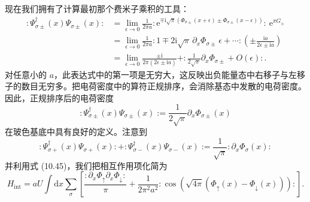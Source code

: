 现在我们拥有了计算最初那个费米子乘积的工具：
\begin{align*}
:\Psi_{\sigma\pm}^{\dagger}(x)\Psi_{\sigma\pm}(x):&=\lim_{\epsilon\to 0}\frac{1}{2\pi a}:\mathrm{e}^{\mp\mathrm{i}\sqrt{\pi}\left(\Phi_{\sigma\pm}(x+\epsilon)\pm\Phi_{\sigma\pm}(x-\epsilon)\right)}:\ \mathrm{e}^{\pi G_{\pm}}\\
&=\lim_{\epsilon\to 0}\frac{1}{2\pi a}:1\mp 2\mathrm{i}\sqrt{\pi}\,\partial_{x}\Phi_{\sigma\pm}\,\epsilon+\cdots:\left(\pm\frac{\mathrm{i}a}{2\epsilon\pm\mathrm{i}a}\right)\\
&=\lim_{\epsilon\to 0}\frac{\pm\mathrm{i}}{2\pi(2\epsilon\pm\mathrm{i}a)}+:\frac{1}{2\sqrt{\pi}}\partial_{x}\Phi_{\sigma\pm}+O(\epsilon):.
\tag{10.54}
\end{align*}
对任意小的 $a$，此表达式中的第一项是无穷大，这反映出负能量态中右移子与左移子的数目无穷多。把电荷密度中的算符正规排序，会消除基态中发散的电荷密度。因此，正规排序后的电荷密度
\begin{equation*}
:\Psi_{\sigma\pm}^{\dagger}(x)\Psi_{\sigma\pm}(x):=\frac{1}{2\sqrt{\pi}}\partial_{x}\Phi_{\sigma\pm}(x)
\tag{10.55}
\end{equation*}
在玻色基底中具有良好的定义。注意到
\begin{equation*}
:\Psi_{\sigma+}^{\dagger}(x)\Psi_{\sigma+}(x):+:\Psi_{\sigma-}^{\dagger}(x)\Psi_{\sigma-}(x):=\frac{1}{\sqrt{\pi}}:\partial_{x}\Phi_{\sigma}(x):
\tag{10.56}
\end{equation*}
并利用式 (10.45)，我们把相互作用项化简为
\begin{equation*}
H_{\mathrm{int}}=aU\int\mathrm{d}x\sum_{\sigma}\left[\frac{:\partial_{x}\Phi_{\uparrow}\partial_{x}\Phi_{\downarrow}:}{\pi}+\frac{1}{2\pi^{2}a^{2}}:\cos\left(\sqrt{4\pi}\left(\Phi_{\uparrow}(x)-\Phi_{\downarrow}(x)\right)\right):\right].
\tag{10.57}
\end{equation*}

